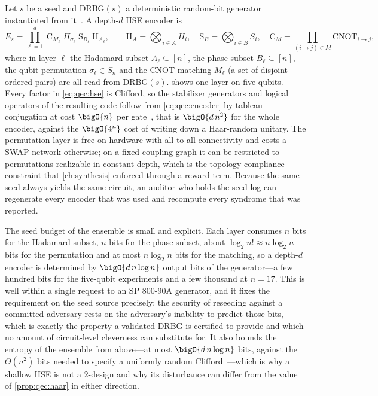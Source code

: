 Let $s$ be a seed and $\mathrm{DRBG}(s)$ a deterministic random-bit generator instantiated from it~\cite{nist2015sp80090a}. A depth-$d$ HSE encoder is
\begin{equation}\label{eq:qec:hse}
  E_s=\prod_{\ell=1}^{d}\ \mathrm{C}_{M_\ell}\;\Pi_{\sigma_\ell}\;\mathrm{S}_{B_\ell}\;\mathrm{H}_{A_\ell},
  \qquad
  \mathrm{H}_{A}=\bigotimes_{i\in A}H_i,\quad
  \mathrm{S}_{B}=\bigotimes_{i\in B}S_i,\quad
  \mathrm{C}_{M}=\prod_{(i\to j)\in M}\mathrm{CNOT}_{i\to j},
\end{equation}
where in layer $\ell$ the Hadamard subset $A_\ell\subseteq[n]$, the phase subset $B_\ell\subseteq[n]$, the qubit permutation $\sigma_\ell\in S_n$ and the CNOT matching $M_\ell$ (a set of disjoint ordered pairs) are all read from $\mathrm{DRBG}(s)$.  shows one layer on five qubits. Every factor in \cref{eq:qec:hse} is Clifford, so the stabilizer generators and logical operators of the resulting code follow from \cref{eq:qec:encoder} by tableau conjugation at cost $\bigO{n}$ per gate~\cite{aaronson2004stabilizer}, that is $\bigO{d\,n^{2}}$ for the whole encoder, against the $\bigO{4^{n}}$ cost of writing down a Haar-random unitary. The permutation layer is free on hardware with all-to-all connectivity and costs a SWAP network otherwise; on a fixed coupling graph it can be restricted to permutations realizable in constant depth, which is the topology-compliance constraint that \cref{ch:synthesis} enforced through a reward term. Because the same seed always yields the same circuit, an auditor who holds the seed log can regenerate every encoder that was used and recompute every syndrome that was reported.

The seed budget of the ensemble is small and explicit. Each layer consumes $n$ bits for the Hadamard subset, $n$ bits for the phase subset, about $\log_2 n!\approx n\log_2 n$ bits for the permutation and at most $n\log_2 n$ bits for the matching, so a depth-$d$ encoder is determined by $\bigO{d\,n\log n}$ output bits of the generator---a few hundred bits for the five-qubit experiments and a few thousand at $n=17$. This is well within a single request to an SP 800-90A generator, and it fixes the requirement on the seed source precisely: the security of reseeding against a committed adversary rests on the adversary's inability to predict those bits, which is exactly the property a validated DRBG is certified to provide and which no amount of circuit-level cleverness can substitute for. It also bounds the entropy of the ensemble from above---at most $\bigO{d\,n\log n}$ bits, against the $\Theta(n^{2})$ bits needed to specify a uniformly random Clifford~\cite{koenig2014clifford}---which is why a shallow HSE is not a 2-design and why its disturbance can differ from the value of \cref{prop:qec:haar} in either direction.

